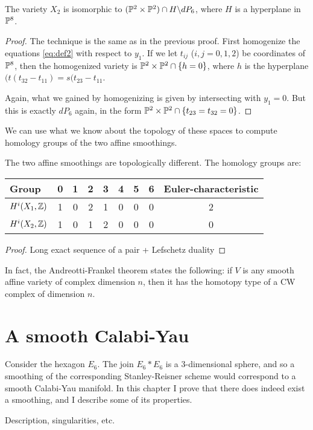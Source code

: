\documentclass[]{uiophd}
\begin{document}
\begin{lemma}
The variety $X_2$ is isomorphic to $(\mathbb{P}^2 \times \mathbb{P}^2) \cap H \backslash dP_6$, where $H$ is a hyperplane in $\mathbb{P}^8$.
\end{lemma}
\begin{proof}
The technique is the same as in the previous proof. First homogenize the equations \eqref{eq:def2} with respect to $y_1$. If we let $t_{ij}$ ($i,j=0,1,2$) be coordinates of $\mathbb{P}^8$, then the homogenized variety is $\mathbb{P}^2 \times \mathbb{P}^2 \cap \{h = 0\}$, where $h$ is the hyperplane $(t(t_{32}-t_{11})=s(t_{23}-t_{11}$.

Again, what we gained by homogenizing is given by intersecting with $y_1=0$. But this is exactly $dP_6$ again, in the form $\mathbb{P}^2 \times \mathbb{P}^2 \cap \{ t_{23}=t_{32}=0 \}$. 
\end{proof}

We can use what we know about the topology of these spaces to compute homology groups of the two affine smoothings.

\begin{thm}
The two affine smoothings are topologically different. The homology groups are:

\begin{tabular}{ l || c | c | c | c | c | c | c || c }
 Group & 0 & 1 & 2 & 3 & 4 & 5 & 6 & Euler-characteristic \\
\hline
$H^i(X_1,\mathbb{Z})$ & 1 & 0 & 2 & 1 & 0 & 0 & 0 & 2 \\
$H^i(X_2,\mathbb{Z})$ & 1 & 0 & 1 & 2 & 0 & 0 & 0  & 0
\end{tabular}
\end{thm}

\begin{proof}
Long exact sequence of a pair + Lefschetz duality 
\end{proof}

\begin{remark}
In fact, the Andreotti-Frankel theorem \cite{andreotti_affinecw} states the following: if $V$ is any smooth affine variety of complex dimension $n$, then it has the homotopy type of a CW complex of dimension $n$.
\end{remark}


\chapter{A smooth Calabi-Yau}

Consider the hexagon $E_6$. The join $E_6 \ast E_6$ is a $3$-dimensional sphere, and so a smoothing of the corresponding Stanley-Reisner scheme would correspond to a smooth Calabi-Yau manifold. In this chapter I prove that there does indeed exist a smoothing, and I describe some of its properties.

Description, singularities, etc.




\end{document}
